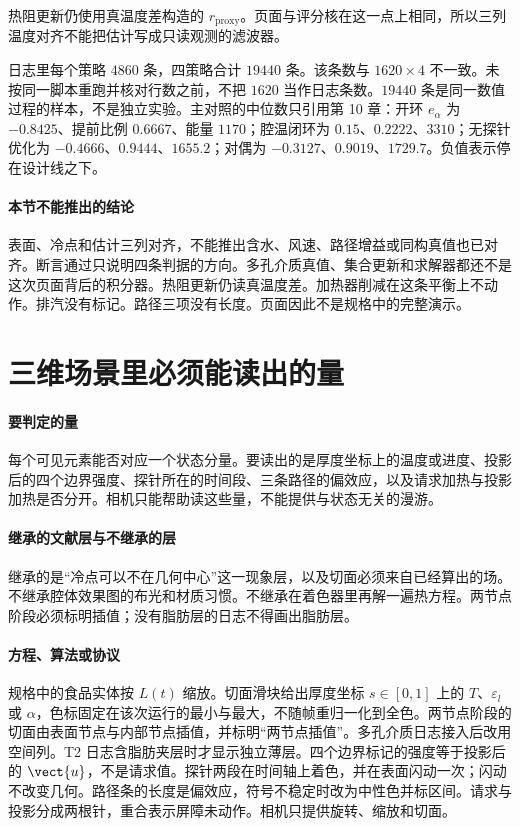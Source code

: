 热阻更新仍使用真温度差构造的 $r_{\mathrm{proxy}}$。页面与评分核在这一点上相同，所以三列温度对齐不能把估计写成只读观测的滤波器。

日志里每个策略 $4860$ 条，四策略合计 $19440$ 条。该条数与 $1620\times 4$ 不一致。未按同一脚本重跑并核对行数之前，不把 $1620$ 当作日志条数。$19440$ 条是同一数值过程的样本，不是独立实验。主对照的中位数只引用第 10 章：开环 $e_\alpha$ 为 $-0.8425$、提前比例 $0.6667$、能量 $1170$；腔温闭环为 $0.15$、$0.2222$、$3310$；无探针优化为 $-0.4666$、$0.9444$、$1655.2$；对偶为 $-0.3127$、$0.9019$、$1729.7$。负值表示停在设计线之下。

\paragraph{本节不能推出的结论}
表面、冷点和估计三列对齐，不能推出含水、风速、路径增益或同构真值也已对齐。断言通过只说明四条判据的方向。多孔介质真值、集合更新和求解器都还不是这次页面背后的积分器。热阻更新仍读真温度差。加热器削减在这条平衡上不动作。排汽没有标记。路径三项没有长度。页面因此不是规格中的完整演示。

\section{三维场景里必须能读出的量}

\paragraph{要判定的量}
每个可见元素能否对应一个状态分量。要读出的是厚度坐标上的温度或进度、投影后的四个边界强度、探针所在的时间段、三条路径的偏效应，以及请求加热与投影加热是否分开。相机只能帮助读这些量，不能提供与状态无关的漫游。

\paragraph{继承的文献层与不继承的层}
继承的是“冷点可以不在几何中心”这一现象层，以及切面必须来自已经算出的场。不继承腔体效果图的布光和材质习惯。不继承在着色器里再解一遍热方程。两节点阶段必须标明插值；没有脂肪层的日志不得画出脂肪层。

\paragraph{方程、算法或协议}
规格中的食品实体按 $L(t)$ 缩放。切面滑块给出厚度坐标 $s\in[0,1]$ 上的 $T$、$\varepsilon_l$ 或 $\alpha$，色标固定在该次运行的最小与最大，不随帧重归一化到全色。两节点阶段的切面由表面节点与内部节点插值，并标明“两节点插值”。多孔介质日志接入后改用空间列。T2 日志含脂肪夹层时才显示独立薄层。四个边界标记的强度等于投影后的 $\vect{u}$，不是请求值。探针两段在时间轴上着色，并在表面闪动一次；闪动不改变几何。路径条的长度是偏效应，符号不稳定时改为中性色并标区间。请求与投影分成两根针，重合表示屏障未动作。相机只提供旋转、缩放和切面。

